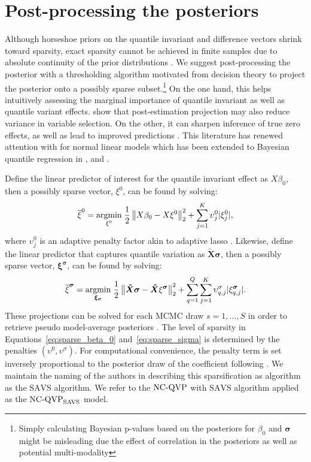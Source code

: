 \section{Post-processing the posteriors}\label{sec:savs}
%
Although horseshoe priors on the quantile invariant and difference vectors shrink toward sparsity, exact sparsity cannot be achieved in finite samples due to absolute continuity of the prior distributions \citep{carvalho_handling_2009}. We suggest post-processing the posterior with a thresholding algorithm motivated from decision theory \citep{lindley1968choice} to project the posterior onto a possibly sparse subset.\footnote{Simply calculating Bayesian p-values based on the posteriors for $\beta_0$ and $\boldsymbol{\sigma}$ might be misleading due the effect of correlation in the posteriors as well as potential multi-modality} On the one hand, this helps intuitively assessing the marginal importance of quantile invariant as well as quantile variant effects. \citet{piironen_sparsity_2017} show that post-estimation projection may also reduce variance in variable selection. On the other, it can sharpen inference of true zero effects, as well as lead to improved predictions \citep{huber2021inducing,kohns2025flexible}. This literature has renewed attention with \citet{hahn2015decoupling} for normal linear models which has been extended to Bayesian quantile regression in \citet{kohns2021decoupling}, and \citet{feldman2023bayesian}. 
%

Define the linear predictor of interest for the quantile invariant effect as $X\beta_0$, then a possibly sparse vector, $\xi^0$, can be found by solving:
%
\begin{equation} \label{eq:sparse_beta_0}
\overline{\xi}^0 = \underset{\xi^0}{\text{argmin}} \; \frac{1}{2}\left\lVert X\beta_0 - X\xi^0\right\rVert^2_2 + \sum^{K}_{j=1}\upsilon^0_j|\xi^0_{j}|,
\end{equation}
%
where $\upsilon^0_j$ is an adaptive penalty factor akin to adaptive lasso \citep{zou2006adaptive}. Likewise, define the linear predictor that captures quantile variation as $\boldsymbol{\tilde{X}}\boldsymbol{\sigma}$, then a possibly sparse vector, $\boldsymbol{\xi^{\sigma}}$, can be found by solving:
%
\begin{equation} \label{eq:sparse_sigma}
    \overline{\xi}^{\boldsymbol{\sigma}} = \underset{\boldsymbol{\xi_{\sigma}}}{\text{argmin}} \; \frac{1}{2}\left\lVert\boldsymbol{\tilde{X}}\boldsymbol{\sigma} - \boldsymbol{\tilde{X}}\xi^{\boldsymbol{\sigma}}\right\rVert^2_2 + \sum^{Q}_{q=1}\sum^{K}_{j=1}\upsilon^{\sigma}_{q,j}|\xi^{\boldsymbol{\sigma}}_{q,j}|.
\end{equation}
%
These projections can be solved for each MCMC draw $s = 1,\dotsc,S$ in order to retrieve pseudo model-average posteriors \citep{bhattacharya2016fast}. The level of sparsity in Equations~\ref{eq:sparse_beta_0} and~\ref{eq:sparse_sigma} is determined by the penalties $(\upsilon^0,\upsilon^{\sigma})$. For computational convenience, the penalty term is set inversely proportional to the posterior draw of the coefficient following \citet{ray2018signal}. We maintain the naming of the authors in describing this sparsification as algorithm as the $\mathrm{SAVS}$ algorithm. We refer to the $\operatorname{NC-QVP}$ with $\mathrm{SAVS}$ algorithm applied as the $\operatorname{NC-QVP}_\mathrm{SAVS}$ model.
